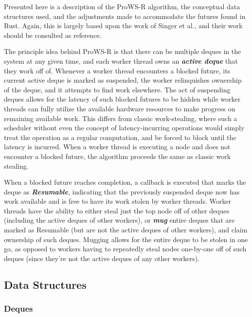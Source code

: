 \documentclass[bsc,frontabs,singlespacing,parskip,deptreport,normalheadings]{infthesis}
\begin{document}
Presented here is a description of the ProWS-R algorithm, the conceptual data
structures used, and the adjustments made to accommodate the futures found in
Rust. Again, this is largely based upon the work of Singer et al., and their
work should be consulted as reference.

The principle idea behind ProWS-R is that there can be multiple deques in the
system at any given time, and each worker thread owns an \textbf{\textit{active
deque}} that they work off of. Whenever a worker thread encounters a blocked
future, its current active deque is marked as suspended, the worker relinquishes
ownership of the deque, and it attempts to find work elsewhere. The act of
suspending deques allows for the latency of such blocked futures to be hidden
while worker threads can fully utilize the available hardware resources to make
progress on remaining available work. This differs from classic work-stealing,
where such a scheduler without even the concept of latency-incurring operations
would simply treat the operation as a regular computation, and be forced to
block until the latency is incurred. When a worker thread is executing a node
and does not encounter a blocked future, the algorithm proceeds the same as
classic work stealing.

When a blocked future reaches completion, a callback is executed that marks the
deque as \textbf{\textit{Resumable}}, indicating that the previously suspended
deque now has work available and is free to have its work stolen by worker
threads. Worker threads have the ability to either steal just the top node off
of other deques (including the active deques of other workers), or
\textit{\textbf{mug}} entire deques that are marked as Resumable (but are not
the active deques of other workers), and claim ownership of such deques. Mugging
allows for the entire deque to be stolen in one go, as opposed to workers having
to repeatedly steal nodes one-by-one off of such deques (since they're not the
active deques of any other workers). 

\subsection{Data Structures}

\subsubsection*{Deques}
\label{subsubsection:deques}
\end{document}

